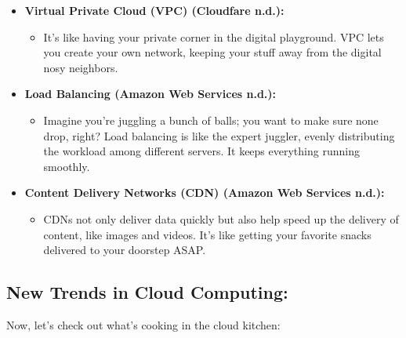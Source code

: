 \documentclass[
  letterpaper,
  DIV=11,
  numbers=noendperiod]{scrreprt}
\providecommand{\tightlist}{%
  \setlength{\itemsep}{0pt}\setlength{\parskip}{0pt}}\usepackage{longtable,booktabs,array}
\begin{document}
\begin{itemize}
\item
  \textbf{Virtual Private Cloud (VPC) (Cloudfare n.d.):}

  \begin{itemize}
  \tightlist
  \item
    It's like having your private corner in the digital playground. VPC
    lets you create your own network, keeping your stuff away from the
    digital nosy neighbors.
  \end{itemize}
\item
  \textbf{Load Balancing (Amazon Web Services n.d.):}

  \begin{itemize}
  \tightlist
  \item
    Imagine you're juggling a bunch of balls; you want to make sure none
    drop, right? Load balancing is like the expert juggler, evenly
    distributing the workload among different servers. It keeps
    everything running smoothly.
  \end{itemize}
\item
  \textbf{Content Delivery Networks (CDN) (Amazon Web Services n.d.):}

  \begin{itemize}
  \tightlist
  \item
    CDNs not only deliver data quickly but also help speed up the
    delivery of content, like images and videos. It's like getting your
    favorite snacks delivered to your doorstep ASAP.
  \end{itemize}
\end{itemize}

\subsection{New Trends in Cloud
Computing:}\label{new-trends-in-cloud-computing}

Now, let's check out what's cooking in the cloud kitchen:
\end{document}
